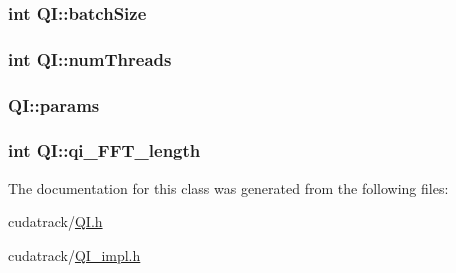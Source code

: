 \subsubsection[{\texorpdfstring{batch\+Size}{batchSize}}]{\setlength{\rightskip}{0pt plus 5cm}int Q\+I\+::batch\+Size\hspace{0.3cm}{\ttfamily [private]}}\hypertarget{class_q_i_aa7bd10a94c9128943ff9f1775614f704}{}\label{class_q_i_aa7bd10a94c9128943ff9f1775614f704}
\subsubsection[{\texorpdfstring{num\+Threads}{numThreads}}]{\setlength{\rightskip}{0pt plus 5cm}int Q\+I\+::num\+Threads\hspace{0.3cm}{\ttfamily [private]}}\hypertarget{class_q_i_afd1c6359668f2de142a18caf2a0e76e0}{}\label{class_q_i_afd1c6359668f2de142a18caf2a0e76e0}
\subsubsection[{\texorpdfstring{params}{params}}]{ Q\+I\+::params\hspace{0.3cm}{\ttfamily [private]}}\hypertarget{class_q_i_af69f420666212bcf5f10a5cf03cd161a}{}\label{class_q_i_af69f420666212bcf5f10a5cf03cd161a}
\subsubsection[{\texorpdfstring{qi\+\_\+\+F\+F\+T\+\_\+length}{qi_FFT_length}}]{\setlength{\rightskip}{0pt plus 5cm}int Q\+I\+::qi\+\_\+\+F\+F\+T\+\_\+length\hspace{0.3cm}{\ttfamily [private]}}\hypertarget{class_q_i_a9959b6d60486da504fca5c3c86fb2fdd}{}\label{class_q_i_a9959b6d60486da504fca5c3c86fb2fdd}


The documentation for this class was generated from the following files\+:\begin{DoxyCompactItemize}
\item 
cudatrack/\hyperlink{_q_i_8h}{Q\+I.\+h}\item 
cudatrack/\hyperlink{_q_i__impl_8h}{Q\+I\+\_\+impl.\+h}\end{DoxyCompactItemize}
